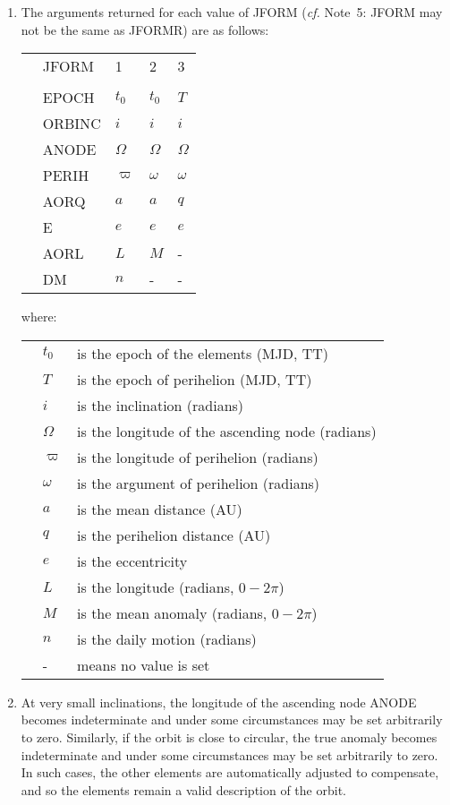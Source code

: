 \documentclass[11pt,twoside,nolof]{starlink}
\begin{document}
{\begin{enumerate}
  \item The arguments returned for each value of JFORM (\textit{cf.}\/ Note~5:
        JFORM may not be the same as JFORMR) are as follows:

        \begin{tabular}{lllll}
        & JFORM  & 1        & 2        & 3 \\ \\
        & EPOCH  & $t_0$    & $t_0$    & $T$ \\
        & ORBINC & $i$      & $i$      & $i$ \\
        & ANODE  & $\Omega$ & $\Omega$ & $\Omega$ \\
        & PERIH  & $\varpi$ & $\omega$ & $\omega$ \\
        & AORQ   & $a$      & $a$      & $q$ \\
        & E      & $e$      & $e$      & $e$ \\
        & AORL   & $L$      & $M$      & - \\
        & DM     & $n$      & -        & -
        \end{tabular}

        where:

        \begin{tabular}{lll}
        & $t_0$    & is the epoch of the elements (MJD, TT) \\
        & $T$      & is the epoch of perihelion (MJD, TT) \\
        & $i$      & is the inclination (radians) \\
        & $\Omega$ & is the longitude of the ascending node (radians) \\
        & $\varpi$ & is the longitude of perihelion (radians) \\
        & $\omega$ & is the argument of perihelion (radians) \\
        & $a$      & is the mean distance (AU) \\
        & $q$      & is the perihelion distance (AU) \\
        & $e$      & is the eccentricity \\
        & $L$      & is the longitude (radians, $0-2\pi$) \\
        & $M$      & is the mean anomaly (radians, $0-2\pi$) \\
        & $n$      & is the daily motion (radians) \\
        & - & means no value is set
        \end{tabular}

  \item At very small inclinations, the longitude of the ascending node
        ANODE becomes indeterminate and under some circumstances may be
        set arbitrarily to zero.  Similarly, if the orbit is close to
        circular, the true anomaly becomes indeterminate and under some
        circumstances may be set arbitrarily to zero.  In such cases,
        the other elements are automatically adjusted to compensate,
        and so the elements remain a valid description of the orbit.
 \end{enumerate}
}
\end{document}
